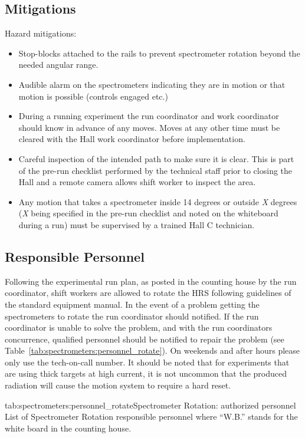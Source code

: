{{\begin{safetyen}{0}{0}
\subsection{Mitigations}

Hazard mitigations:
\begin{itemize}
\item{Stop-blocks attached to the rails to prevent spectrometer rotation beyond the needed angular range.}
\item{Audible alarm on the spectrometers indicating they are in motion or that motion
is possible (controls engaged etc.)}
\item{During a running experiment the run coordinator and work coordinator should know in advance 
of any moves.  Moves at any other time must be cleared with the Hall work coordinator 
before implementation.}
\item{Careful inspection of the intended path to make sure it is clear. This is part of
the pre-run checklist performed by the technical staff prior to closing the Hall and
a remote camera allows shift worker to inspect the area.}
\item{Any motion that takes a spectrometer inside 14 degrees or outside \emph{X} degrees
(\emph{X} being specified in the pre-run checklist and noted on the whiteboard during a run) 
must be supervised by a trained Hall C technician.}
\end{itemize}
\end{safetyen}

\subsection{Responsible Personnel}

Following the experimental run plan, as posted in the counting house
by the run coordinator, shift workers are allowed to rotate the HRS
following guidelines of the standard equipment manual.  In the event
of a problem getting the spectrometers to rotate the run coordinator
should notified.  If the run coordinator is unable to solve the
problem, and with the run coordinators concurrence, qualified
personnel should be notified to repair the problem (see
Table~\ref{tab:spectrometers:personnel_rotate}).  On weekends and after hours
please only use the tech-on-call number.  It should be noted that for
experiments that are using thick targets at high current, it is not
uncommon that the produced radiation will cause the motion system to
require a hard reset.

\begin{namestab}{tab:spectrometers:personnel_rotate}{Spectrometer Rotation: authorized personnel}{%
      List of Spectrometer Rotation responsible personnel where ``W.B.'' stands for the white board 
      in the counting house.}
   \MikeFowler{}
   \WalterKellner{}
   \AndyKenyon{}
   \JoeBeaufait{}
\end{namestab}
}

}
